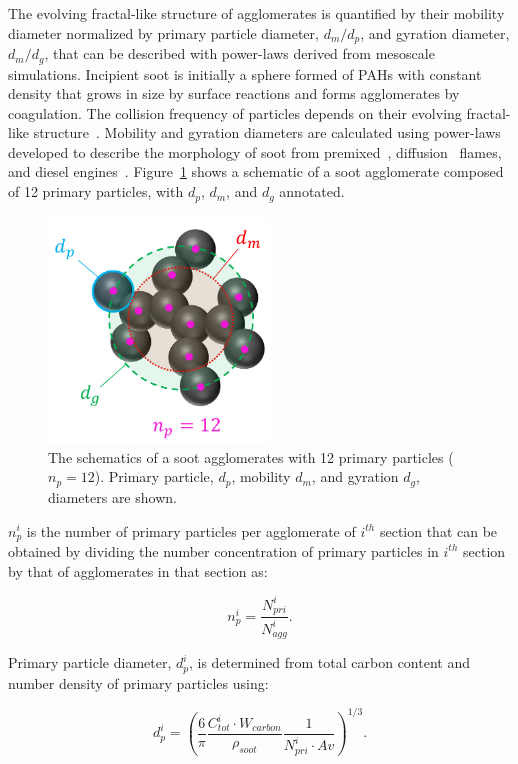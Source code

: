 The evolving fractal-like structure of agglomerates is quantified by their mobility diameter normalized by primary particle diameter, $d_m/d_p$, and gyration diameter, $d_m/d_g$, that can be described with power-laws derived from mesoscale simulations.
Incipient soot is initially a sphere formed of PAHs with constant density that grows in size by surface reactions and forms agglomerates by coagulation. The collision frequency of particles depends on their evolving fractal-like structure~\citep{mulholland1988cluster}.
Mobility and gyration diameters are calculated using power-laws developed to describe the morphology of soot from premixed~\citep{abid2008evolution}, diffusion~\citep{yon2015simple} flames, and diesel engines~\citep{rissler2013effective}. Figure~\ref{fig:Morphology} shows a schematic of a soot agglomerate composed of 12 primary particles, with ${d_p}$, ${d_m}$, and ${d_g}$ annotated.
\begin{figure}[!htbp]
	\centering
	\includegraphics[height=60mm, ]{Figures/Theory/Morphology.pdf}
	\caption{The schematics of a soot agglomerates with 12 primary particles (${n_p=12}$). Primary particle, ${d_p}$, mobility ${d_m}$, and gyration ${d_g}$, diameters are shown.}
	\label{fig:Morphology}
\end{figure} 


${n^i_p}$ is the number of primary particles per agglomerate of ${i^{th}}$ section that can be obtained by dividing the number concentration of primary particles in ${i^{th}}$ section by that of agglomerates in that section as:

\begin{equation}
	n^i_p = \frac{N^i_{pri}}{N^i_{agg}}
	\label{eqn:n_p}.
\end{equation}

Primary particle diameter, ${d^i_p}$, is determined from total carbon content and number density of primary particles using:

\begin{equation}
	d^i_p = \left(\frac{6}{\pi} \frac{C^i_{tot}\cdot W_{carbon}}{\rho_{soot}} \frac{1}{N^i_{pri}\cdot Av} \right)^{1/3}.
	\label{eqn:d_p}
\end{equation}

